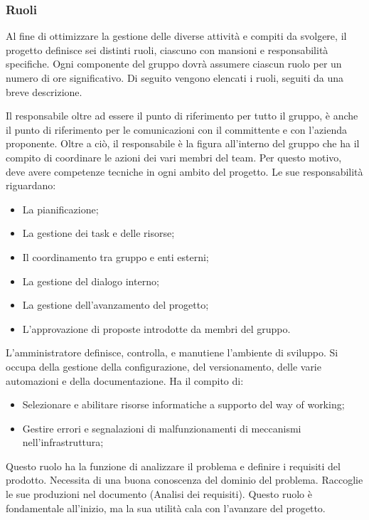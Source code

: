 \documentclass[10pt, a4paper]{article}
\begin{document}
\subsubsection{Ruoli}
Al fine di ottimizzare la gestione delle diverse attività e compiti da svolgere, il progetto definisce sei distinti ruoli, ciascuno con mansioni e responsabilità specifiche.
Ogni componente del gruppo dovrà assumere ciascun ruolo per un numero di ore significativo.
Di seguito vengono elencati i ruoli, seguiti da una breve descrizione.

Il responsabile oltre ad essere il punto di riferimento per tutto il gruppo, è anche il punto di riferimento per le comunicazioni con il committente e con l'azienda proponente. Oltre a ciò, il responsabile è la figura all'interno del gruppo che ha il compito di coordinare le azioni dei vari membri del team. Per questo motivo, deve avere competenze tecniche in ogni ambito del progetto.
Le sue responsabilità riguardano:
\begin{itemize}
    \item La pianificazione;
    \item La gestione dei task e delle risorse;
    \item Il coordinamento tra gruppo e enti esterni;
    \item La gestione del dialogo interno;
    \item La gestione dell'avanzamento del progetto;
    \item L'approvazione di proposte introdotte da membri del gruppo.
\end{itemize}
L'amministratore definisce, controlla, e manutiene l'ambiente di sviluppo. Si occupa della gestione della configurazione, del versionamento, delle varie automazioni e della documentazione.
Ha il compito di:
\begin{itemize}
    \item Selezionare e abilitare risorse informatiche a supporto del way of working;
    \item Gestire errori e segnalazioni di malfunzionamenti di meccanismi nell'infrastruttura;
\end{itemize}
Questo ruolo ha la funzione di analizzare il problema e definire i requisiti del prodotto. Necessita di una buona conoscenza del dominio del problema. Raccoglie le sue produzioni nel documento (Analisi dei requisiti).
Questo ruolo è fondamentale all'inizio, ma la sua utilità cala con l'avanzare del progetto. 
\end{document}
